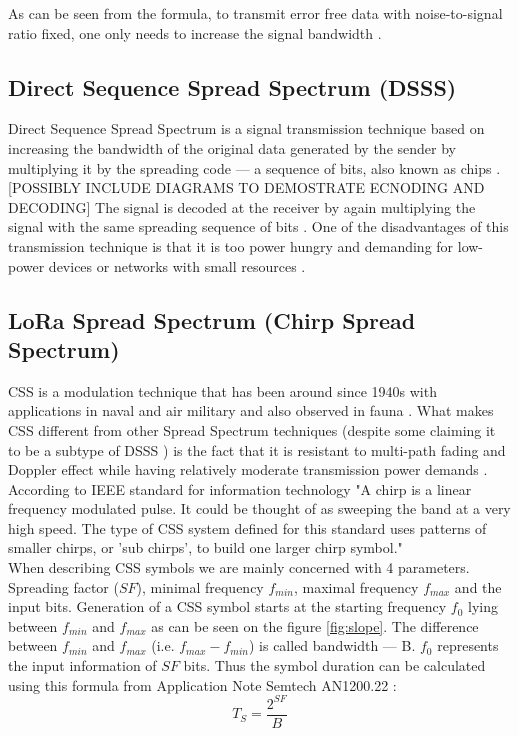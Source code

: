 As can be seen from the formula, to transmit error free data with noise-to-signal ratio fixed, one only needs to increase the signal bandwidth \cite{semtech_spec}.

\subsection{Direct Sequence Spread Spectrum (DSSS)}

Direct Sequence Spread Spectrum is a signal transmission technique based on increasing the bandwidth of the original data generated by the sender by multiplying it by the spreading code — a sequence of bits, also known as chips \cite{dsss_article}. [POSSIBLY INCLUDE DIAGRAMS TO DEMOSTRATE ECNODING AND DECODING] The signal is decoded at the receiver by again multiplying the signal with
the same spreading sequence of bits \cite{dsss_article}. One of the disadvantages of this transmission technique is that it is too power hungry and demanding for low-power devices or networks with small resources \cite{semtech_spec}.

\subsection{LoRa Spread Spectrum (Chirp Spread Spectrum)}

CSS is a modulation technique that has been around since 1940s \cite{semtech_spec} with 
applications in naval and air military and also observed in fauna \cite{origins}. What makes CSS different from other Spread Spectrum techniques (despite some claiming it to be a subtype of DSSS \cite{orthogonality_description}) is the fact that it is resistant to multi-path fading and Doppler effect while having relatively moderate transmission power demands \cite{semtech_spec}. \\

According to IEEE standard for information technology \cite{ieee_2007} "A chirp is a linear frequency modulated pulse. It could be thought of as sweeping the band at a very high speed. The type of CSS system defined for this standard uses patterns of smaller chirps, or ’sub chirps’, to build one larger chirp symbol." \\

When describing CSS symbols we are mainly concerned with 4 parameters. 
Spreading factor ($SF$), minimal frequency $f_{min}$, maximal frequency $f_{max}$ and the input bits. Generation of a CSS symbol starts at the starting frequency $f_0$ lying between $f_{min}$ and $f_{max}$ as can be seen on the figure \ref{fig:slope}. The difference between $f_{min}$ and $f_{max}$ (i.e. $f_{max} - f_{min}$) is called bandwidth — B. $f_0$ represents the input information of $SF$ bits. Thus the symbol duration can be calculated using this formula from Application Note Semtech AN1200.22 \cite{semtech_spec}: 
\begin{equation}
    T_S = \frac{2^{SF}}{B} 
\end{equation}

